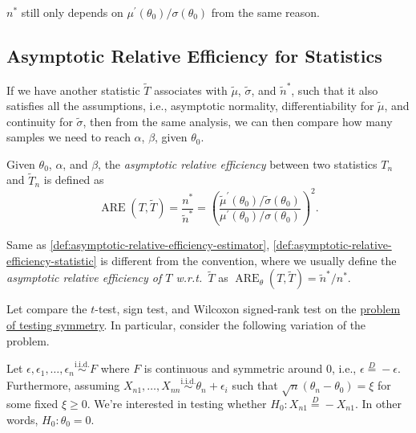 \begin{remark}
	\(n^{\ast} \) still only depends on \(\mu ^{\prime} (\theta _0) / \sigma (\theta _0)\) from the same reason.
\end{remark}

\subsection{Asymptotic Relative Efficiency for Statistics}
If we have another statistic \(\widetilde{T} \) associates with \(\widetilde{\mu} \), \(\widetilde{\sigma} \), and \(\widetilde{n} ^{\ast} \), such that it also satisfies all the assumptions, i.e., asymptotic normality, differentiability for \(\widetilde{\mu} \), and continuity for \(\widetilde{\sigma} \), then from the same analysis, we can then compare how many samples we need to reach \(\alpha \), \(\beta \), given \(\theta _0\).

\begin{definition}\label{def:asymptotic-relative-efficiency-statistic}
	Given \(\theta _0\), \(\alpha \), and \(\beta \), the \emph{asymptotic relative efficiency} between two statistics \(T_n\) and \(\widetilde{T} _n\) is defined as
	\[
		\operatorname{ARE}(T, \widetilde{T} )
		= \frac{n^{\ast} }{\widetilde{n} ^{\ast} }
		= \left( \frac{\widetilde{\mu} ^{\prime} (\theta _0) / \widetilde{\sigma} (\theta _0)}{\mu ^{\prime} (\theta _0) / \sigma (\theta _0)} \right) ^2.
	\]
\end{definition}

\begin{note}
	Same as \autoref{def:asymptotic-relative-efficiency-estimator}, \autoref{def:asymptotic-relative-efficiency-statistic} is different from the convention, where we usually define the \emph{asymptotic relative efficiency of \(T\) w.r.t.\ \(\widetilde{T} \)} as \(\operatorname{ARE}_\theta (T, \widetilde{T} ) = \widetilde{n} ^{\ast} / n^{\ast} \).
\end{note}

Let compare the \(t\)-test, sign test, and Wilcoxon signed-rank test on the \hyperref[prb:testing-symmetry]{problem of testing symmetry}. In particular, consider the following variation of the problem.

\begin{problem*}
	Let \(\epsilon , \epsilon _1, \dots, \epsilon _n \overset{\text{i.i.d.} }{\sim } F\) where \(F\) is continuous and symmetric around \(0\), i.e., \(\epsilon \overset{D}{=} -\epsilon \). Furthermore, assuming \(X_{n1}, \dots , X_{nn} \overset{\text{i.i.d.} }{\sim } \theta _n + \epsilon _i\) such that \(\sqrt{n} (\theta _n - \theta _0) = \xi \) for some fixed \(\xi \geq 0\). We're interested in testing whether \(H_0 \colon X_{n1} \overset{D}{=} -X_{n1}\). In other words, \(H_0 \colon \theta _0 = 0\).
\end{problem*}

